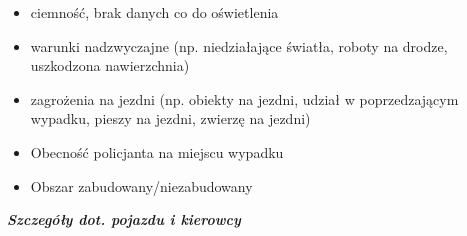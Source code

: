 \begin{itemize}
\item
  ciemność, brak danych co do oświetlenia\\
\item
  warunki nadzwyczajne (np. niedziałające światła, roboty na drodze,
  uszkodzona nawierzchnia)\\
\item
  zagrożenia na jezdni (np. obiekty na jezdni, udział w poprzedzającym
  wypadku, pieszy na jezdni, zwierzę na jezdni)\\
\item
  Obecność policjanta na miejscu wypadku\\
\item
  Obszar zabudowany/niezabudowany
\end{itemize}

\textbf{\emph{Szczegóły dot. pojazdu i kierowcy}}

